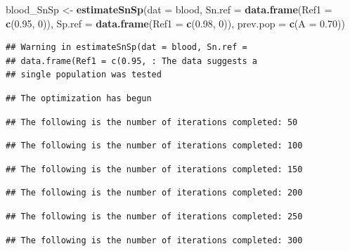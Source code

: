\documentclass[
  12pt,
]{article}
\newenvironment{Shaded}{\begin{snugshade}}{\end{snugshade}}
\newcommand{\AttributeTok}[1]{\textcolor[rgb]{0.13,0.29,0.53}{#1}}
\newcommand{\DecValTok}[1]{\textcolor[rgb]{0.00,0.00,0.81}{#1}}
\newcommand{\FloatTok}[1]{\textcolor[rgb]{0.00,0.00,0.81}{#1}}
\newcommand{\FunctionTok}[1]{\textcolor[rgb]{0.13,0.29,0.53}{\textbf{#1}}}
\newcommand{\NormalTok}[1]{#1}
\newcommand{\OtherTok}[1]{\textcolor[rgb]{0.56,0.35,0.01}{#1}}
\begin{document}
\begin{Shaded}
\begin{Highlighting}[]
\NormalTok{blood\_SnSp }\OtherTok{\textless{}{-}} \FunctionTok{estimateSnSp}\NormalTok{(}\AttributeTok{dat =}\NormalTok{ blood,}
                           \AttributeTok{Sn.ref =} \FunctionTok{data.frame}\NormalTok{(}\AttributeTok{Ref1 =} \FunctionTok{c}\NormalTok{(}\FloatTok{0.95}\NormalTok{, }\DecValTok{0}\NormalTok{)),}
                           \AttributeTok{Sp.ref =} \FunctionTok{data.frame}\NormalTok{(}\AttributeTok{Ref1 =} \FunctionTok{c}\NormalTok{(}\FloatTok{0.98}\NormalTok{, }\DecValTok{0}\NormalTok{)),}
                           \AttributeTok{prev.pop =} \FunctionTok{c}\NormalTok{(}\AttributeTok{A =} \FloatTok{0.70}\NormalTok{))}
\end{Highlighting}
\end{Shaded}

\begin{verbatim}
## Warning in estimateSnSp(dat = blood, Sn.ref =
## data.frame(Ref1 = c(0.95, : The data suggests a
## single population was tested
\end{verbatim}

\begin{verbatim}
## The optimization has begun
\end{verbatim}

\begin{verbatim}
## The following is the number of iterations completed: 50
\end{verbatim}

\begin{verbatim}
## The following is the number of iterations completed: 100
\end{verbatim}

\begin{verbatim}
## The following is the number of iterations completed: 150
\end{verbatim}

\begin{verbatim}
## The following is the number of iterations completed: 200
\end{verbatim}

\begin{verbatim}
## The following is the number of iterations completed: 250
\end{verbatim}

\begin{verbatim}
## The following is the number of iterations completed: 300
\end{verbatim}
\end{document}
